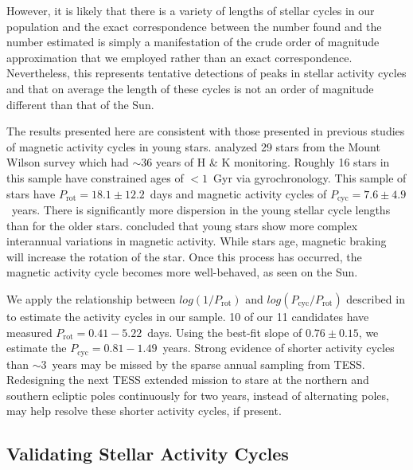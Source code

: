 \documentclass[twocolumn]{aastex631}
\begin{document}
However, it is likely that there is a variety of lengths of stellar cycles in our
population and the exact correspondence between the number found and the number
estimated is simply a manifestation of the crude order of magnitude approximation
that we employed rather than an exact correspondence. Nevertheless, this represents
tentative detections of peaks in stellar activity cycles and that on average the
length of these cycles is not an order of magnitude different than that of the Sun.

The results presented here are consistent with those presented in
previous studies of magnetic activity cycles in young stars. \cite{olah16} analyzed
29 stars from the Mount Wilson survey which had $\sim 36$ years of 
H \& K monitoring. Roughly 16 stars in this sample have constrained ages of $< 1$~Gyr
via gyrochronology. This sample of stars have $P_\textrm{rot} = 18.1 \pm 12.2$~days
and magnetic activity cycles of $P_\textrm{cyc} = 7.6 \pm 4.9$~years. There is
significantly more dispersion in the young stellar cycle lengths than for the older
stars. \cite{olah16} concluded that young stars show more complex interannual variations
in magnetic activity. While stars age, magnetic braking will increase the rotation
of the star. Once this process has occurred, the magnetic activity cycle becomes more
well-behaved, as seen on the Sun.

We apply the relationship between $log(1/P_\textrm{rot})$ and
$log(P_\textrm{cyc}/P_\textrm{rot})$ described in \cite{olah16} to estimate the
activity cycles in our sample. 10 of our 11 candidates have measured
$P_\textrm{rot} = 0.41 - 5.22$~days. Using the best-fit slope of $0.76 \pm 0.15$,
we estimate the $P_\textrm{cyc} = 0.81 - 1.49$~years. Strong evidence of shorter
activity cycles than $\sim 3$~years may be missed by the sparse annual sampling
from TESS. Redesigning the next TESS extended mission to stare at the northern and
southern ecliptic poles continuously for two years, instead of alternating poles,
may help resolve these shorter activity cycles, if present.


\subsection{Validating Stellar Activity Cycles}
\end{document}
